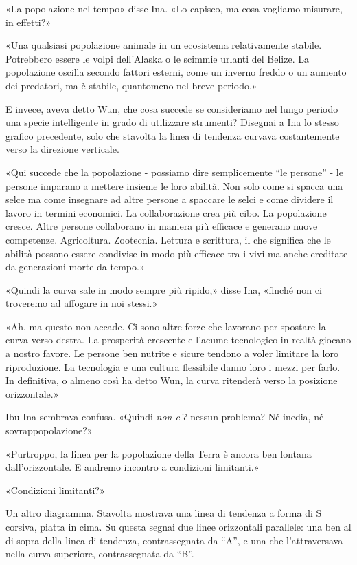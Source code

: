 «La popolazione nel tempo» disse Ina. «Lo capisco, ma cosa vogliamo
misurare, in effetti?»

«Una qualsiasi popolazione animale in un ecosistema relativamente
stabile. Potrebbero essere le volpi dell'Alaska o le scimmie urlanti del
Belize. La popolazione oscilla secondo fattori esterni, come un inverno
freddo o un aumento dei predatori, ma è stabile, quantomeno nel breve
periodo.»

E invece, aveva detto Wun, che cosa succede se consideriamo nel lungo
periodo una specie intelligente in grado di utilizzare strumenti?
Disegnai a Ina lo stesso grafico precedente, solo che stavolta la linea
di tendenza curvava costantemente verso la direzione verticale.

«Qui succede che la popolazione - possiamo dire semplicemente ``le
persone'' - le persone imparano a mettere insieme le loro abilità. Non
solo come si spacca una selce ma come insegnare ad altre persone a
spaccare le selci e come dividere il lavoro in termini economici. La
collaborazione crea più cibo. La popolazione cresce. Altre persone
collaborano in maniera più efficace e generano nuove competenze.
Agricoltura. Zootecnia. Lettura e scrittura, il che significa che le
abilità possono essere condivise in modo più efficace tra i vivi ma
anche ereditate da generazioni morte da tempo.»

«Quindi la curva sale in modo sempre più ripido,» disse Ina, «finché non
ci troveremo ad affogare in noi stessi.»

«Ah, ma questo non accade. Ci sono altre forze che lavorano per spostare
la curva verso destra. La prosperità crescente e l'acume tecnologico in
realtà giocano a nostro favore. Le persone ben nutrite e sicure tendono
a voler limitare la loro riproduzione. La tecnologia e una cultura
flessibile danno loro i mezzi per farlo. In definitiva, o almeno così ha
detto Wun, la curva ritenderà verso la posizione orizzontale.»

Ibu Ina sembrava confusa. «Quindi \emph{non c'è} nessun problema? Né
inedia, né sovrappopolazione?»

«Purtroppo, la linea per la popolazione della Terra è ancora ben lontana
dall'orizzontale. E andremo incontro a condizioni limitanti.»

«Condizioni limitanti?»

Un altro diagramma. Stavolta mostrava una linea di tendenza a forma di S
corsiva, piatta in cima. Su questa segnai due linee orizzontali
parallele: una ben al di sopra della linea di tendenza, contrassegnata
da ``A'', e una che l'attraversava nella curva superiore, contrassegnata
da ``B''.

